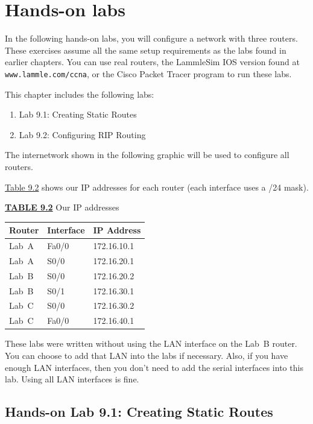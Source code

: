 \section{Hands-on labs}

In the following hands-on labs, you will configure a network with three
routers. These exercises assume all the same setup requirements as the
labs found in earlier chapters. You can use real routers, the LammleSim
IOS version found at \texttt{www.lammle.com/ccna}, or the Cisco Packet
Tracer program to run these labs.

This chapter includes the following labs:

\begin{enumerate}
\item
  Lab 9.1: Creating Static Routes
\item
  Lab 9.2: Configuring RIP Routing
\end{enumerate}

The internetwork shown in the following graphic will be used to
configure all routers.

\begin{figure}
\centering
\caption{}
\end{figure}

\protect\hyperlink{c09.xhtmlux5cux23table9-2}{Table 9.2} shows our IP
addresses for each router (each interface uses a /24 mask).

{\protect\hyperlink{c09.xhtmlux5cux23tableanchor9-2}{\textbf{TABLE 9.2}}
Our IP addresses}

\begin{longtable}[]{@{}lll@{}}
\toprule
Router & Interface & IP Address\tabularnewline
\midrule
\endhead
Lab~A & Fa0/0 & 172.16.10.1\tabularnewline
Lab~A & S0/0 & 172.16.20.1\tabularnewline
Lab~B & S0/0 & 172.16.20.2\tabularnewline
Lab~B & S0/1 & 172.16.30.1\tabularnewline
Lab~C & S0/0 & 172.16.30.2\tabularnewline
Lab~C & Fa0/0 & 172.16.40.1\tabularnewline
\bottomrule
\end{longtable}

\protect\hypertarget{c09.xhtmlux5cux23Page_402}{}{}These labs were
written without using the LAN interface on the Lab~B router. You can
choose to add that LAN into the labs if necessary. Also, if you have
enough LAN interfaces, then you don't need to add the serial interfaces
into this lab. Using all LAN interfaces is fine.

\subsection[Hands-on Lab 9.1: Creating Static
Routes]{\texorpdfstring{\protect\hypertarget{c09.xhtmlux5cux23c09-sec-21}{}{}Hands-on
Lab 9.1: Creating Static
Routes}{Hands-on Lab 9.1: Creating Static Routes}}

